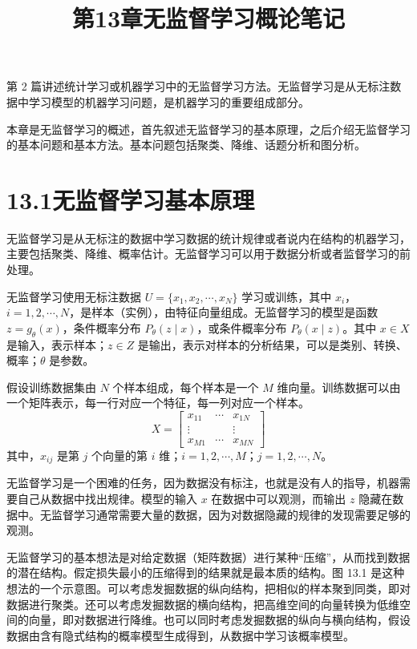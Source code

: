 \documentclass[UTF8,12pt,a4paper,fontset=fandol]{ctexart}
\title{第13章\quad 无监督学习概论笔记}
\author{}
\date{}
\begin{document}
\maketitle

第 2 篇讲述统计学习或机器学习中的无监督学习方法。无监督学习是从无标注数据中学习模型的机器学习问题，是机器学习的重要组成部分。

本章是无监督学习的概述，首先叙述无监督学习的基本原理，之后介绍无监督学习的基本问题和基本方法。基本问题包括聚类、降维、话题分析和图分析。

\section*{13.1\quad 无监督学习基本原理}

无监督学习是从无标注的数据中学习数据的统计规律或者说内在结构的机器学习，主要包括聚类、降维、概率估计。无监督学习可以用于数据分析或者监督学习的前处理。

无监督学习使用无标注数据 $U=\{x_1,x_2,\cdots,x_N\}$ 学习或训练，其中 $x_i$，$i=1,2,\cdots,N$，是样本（实例），由特征向量组成。无监督学习的模型是函数 $z=g_\theta(x)$，条件概率分布 $P_\theta(z\mid x)$，或条件概率分布 $P_\theta(x\mid z)$。其中 $x\in X$ 是输入，表示样本；$z\in Z$ 是输出，表示对样本的分析结果，可以是类别、转换、概率；$\theta$ 是参数。

假设训练数据集由 $N$ 个样本组成，每个样本是一个 $M$ 维向量。训练数据可以由一个矩阵表示，每一行对应一个特征，每一列对应一个样本。
\[
X=
\begin{bmatrix}
x_{11} & \cdots & x_{1N}\\
\vdots & & \vdots\\
x_{M1} & \cdots & x_{MN}
\end{bmatrix}
\]
其中，$x_{ij}$ 是第 $j$ 个向量的第 $i$ 维；$i=1,2,\cdots,M$；$j=1,2,\cdots,N$。

无监督学习是一个困难的任务，因为数据没有标注，也就是没有人的指导，机器需要自己从数据中找出规律。模型的输入 $x$ 在数据中可以观测，而输出 $z$ 隐藏在数据中。无监督学习通常需要大量的数据，因为对数据隐藏的规律的发现需要足够的观测。

无监督学习的基本想法是对给定数据（矩阵数据）进行某种“压缩”，从而找到数据的潜在结构。假定损失最小的压缩得到的结果就是最本质的结构。图 13.1 是这种想法的一个示意图。可以考虑发掘数据的纵向结构，把相似的样本聚到同类，即对数据进行聚类。还可以考虑发掘数据的横向结构，把高维空间的向量转换为低维空间的向量，即对数据进行降维。也可以同时考虑发掘数据的纵向与横向结构，假设数据由含有隐式结构的概率模型生成得到，从数据中学习该概率模型。
\end{document}
